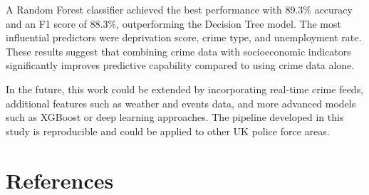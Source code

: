 \documentclass[conference]{IEEEtran}
\begin{document}
A Random Forest classifier achieved the best performance with 89.3\% accuracy and an F1 score of 88.3\%, outperforming the Decision Tree model. The most influential predictors were deprivation score, crime type, and unemployment rate. These results suggest that combining crime data with socioeconomic indicators significantly improves predictive capability compared to using crime data alone.

In the future, this work could be extended by incorporating real-time crime feeds, additional features such as weather and events data, and more advanced models such as XGBoost or deep learning approaches. The pipeline developed in this study is reproducible and could be applied to other UK police force areas.

\section*{References}
\end{document}
